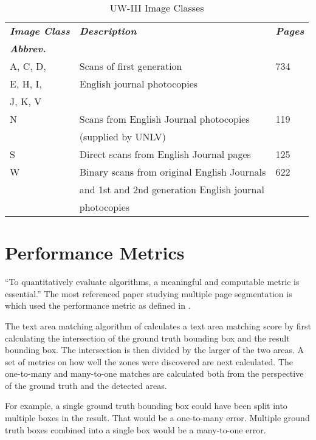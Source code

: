 \documentclass[conference]{IEEEtran}
\begin{document}
\begin{table}
\caption{UW-III Image Classes}
\label{table:UW-III Image Classes}
\begin{tabular}{|l|l|l|}
\hline
\textit{\textbf{Image Class}} & \textit{\textbf{Description}} & \textit{\textbf{Pages}}  \\ 
\textit{\textbf{Abbrev.}} & & \\ 
\hline
    \hline
    A, C, D,   & Scans of first generation & 734 \\
    E, H, I,   & English journal photocopies & \\ 
    J, K, V    &  & \\ 
    \hline
    N & Scans from English Journal photocopies & 119 \\ 
      & (supplied by UNLV) & \\ 
    \hline
    S & Direct scans from English Journal pages & 125 \\ 
    \hline
    W & Binary scans from original English Journals & 622 \\
      & and 1st and 2nd generation English journal & \\
      & photocopies  & \\ 
    \hline
\end{tabular}
\end{table}


\section{Performance Metrics}
``To quantitatively evaluate algorithms, a meaningful and computable metric is
essential.'' \cite{phillips1999empirical}
The most referenced paper studying multiple page segmentation is \cite{shafait2006performance} 
which used the performance metric as defined in
\cite{phillips1999empirical}. 

The text area matching algorithm of \cite{phillips1999empirical} calculates a
text area matching score by first calculating the intersection of the ground
truth bounding box and the result bounding box. The intersection is
then divided by the larger of the two areas. A set of metrics on how well the
zones were discovered are next calculated.  The one-to-many and many-to-one
matches are calculated both from the perspective of the ground truth and the
detected areas. 

For example, a single ground truth bounding box could have been split into
multiple boxes in the result. That would be a one-to-many error. Multiple
ground truth boxes combined into a single box would be a many-to-one error.
\end{document}
